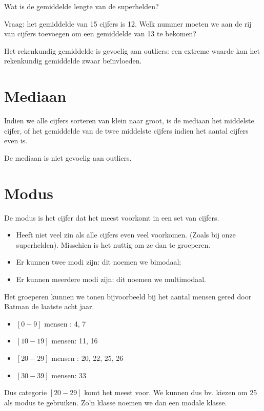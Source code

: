 \begin{exercise}
  Wat is de gemiddelde lengte van de superhelden?
\end{exercise}

\begin{exercise}
  Vraag: het gemiddelde van 15 cijfers is 12. Welk nummer moeten
  we aan de rij van cijfers toevoegen om een gemiddelde van 13 te bekomen?
\end{exercise}

Het rekenkundig gemiddelde is gevoelig aan outliers: een extreme waarde kan het rekenkundig gemiddelde zwaar be\"invloeden.

\section{Mediaan}

\begin{definition}[Mediaan]
  Indien we alle cijfers sorteren van klein naar groot, is de  mediaan het middelste cijfer, of het gemiddelde van de twee middelste cijfers indien het aantal cijfers even is.
\end{definition}

De mediaan is niet gevoelig aan outliers.

\section{Modus}
\begin{definition}[Modus]
  De  modus is het cijfer dat het meest voorkomt in een set van cijfers.
\end{definition}

\begin{itemize}
  \item Heeft niet veel zin als alle cijfers even veel voorkomen. (Zoals bij onze superhelden). Misschien is het nuttig om ze dan te groeperen.
  \item Er kunnen twee modi zijn: dit noemen we  bimodaal;
  \item Er kunnen meerdere modi zijn: dit noemen we  multimodaal.
\end{itemize}

\begin{example}
  Het groeperen kunnen we tonen bijvoorbeeld bij het aantal mensen gered door Batman de laatste acht jaar.
  \begin{itemize}
    \item $[0-9]$ mensen : 4, 7
    \item $[10-19]$ mensen: 11, 16
    \item $[20-29]$ mensen : 20, 22, 25, 26
    \item $[30-39]$ mensen: 33
  \end{itemize}
  Dus categorie $[20-29]$ komt het meest voor. We kunnen dus bv. kiezen om 25 als modus te gebruiken. Zo'n klasse noemen we dan een modale klasse.
\end{example}

